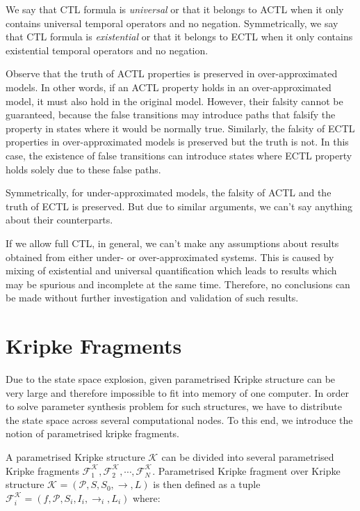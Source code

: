 \documentclass[12pt,oneside,draft]{fithesis2}
\newcommand{\ks}[1][]{\ensuremath{\mathcal{K}_{#1}}}
\newcommand{\kf}[2]{\ensuremath{\mathcal{F}^{#2}_{#1}}}
\newcommand{\fullKs}{\ensuremath{ \ks = (\params, S, S_0, \trans{}, L) }}
\newcommand{\fullKf}[2]{\ensuremath{ \kf{#1}{#2} = (f, \params, S_{#1}, I_{i}, \trans{}_{#1}, L_{#1}) }}
\newcommand{\trans}[1]{\stackrel{#1}{\rightarrow}}
\newcommand{\params}{\mathcal{P}}
\begin{document}
			We say that CTL formula is \emph{universal} or that it belongs to ACTL when it only contains universal temporal operators and no negation. Symmetrically, we say that CTL formula is \emph{existential} or that it belongs to ECTL when it only contains existential temporal operators and no negation.
			
			Observe that the truth of ACTL properties is preserved in over-approximated models. In other words, if an ACTL property holds in an over-approximated model, it must also hold in the original model. However, their falsity cannot be guaranteed, because the false transitions may introduce paths that falsify the property in states where it would be normally true. Similarly, the falsity of ECTL properties in over-approximated models is preserved but the truth is not. In this case, the existence of false transitions can introduce states where ECTL property holds solely due to these false paths.
			
			Symmetrically, for under-approximated models, the falsity of ACTL and the truth of ECTL is preserved. But due to similar arguments, we can't say anything about their counterparts.
			
			If we allow full CTL, in general, we can't make any assumptions about results obtained from either under- or over-approximated systems. This is caused by mixing of existential and universal quantification which leads to results which may be spurious and incomplete at the same time. Therefore, no conclusions can be made without further investigation and validation of such results.
			
		\section{Kripke Fragments}
		
			Due to the state space explosion, given parametrised Kripke structure can be very large and therefore impossible to fit into memory of one computer. In order to solve parameter synthesis problem for such structures, we have to distribute the state space across several computational nodes. To this end, we introduce the notion of parametrised kripke fragments.
			
			A parametrised Kripke structure $\ks$ can be divided into several parametrised Kripke fragments $\kf{1}{\ks}, \kf{2}{\ks}, \cdots , \kf{N}{\ks}$. Parametrised Kripke fragment over Kripke structure $\fullKs$ is then defined as a tuple $\fullKf{i}{\ks}$ where:
			
\end{document}
